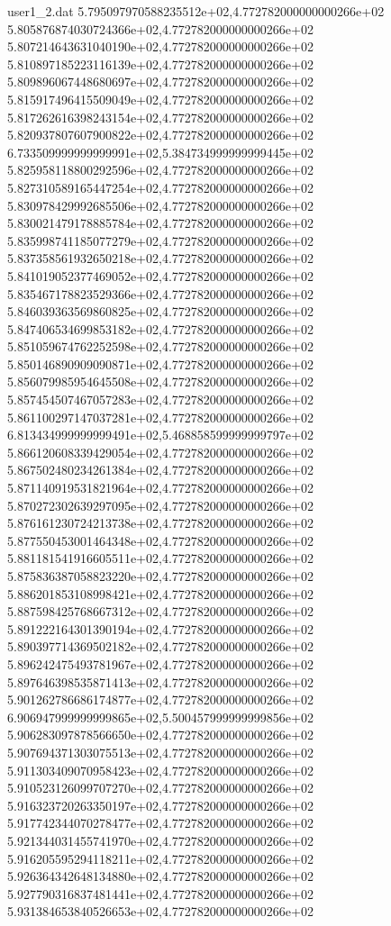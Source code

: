 \begin{filecontents}{user1_2.dat}
5.795097970588235512e+02,4.772782000000000266e+02
5.805876874030724366e+02,4.772782000000000266e+02
5.807214643631040190e+02,4.772782000000000266e+02
5.810897185223116139e+02,4.772782000000000266e+02
5.809896067448680697e+02,4.772782000000000266e+02
5.815917496415509049e+02,4.772782000000000266e+02
5.817262616398243154e+02,4.772782000000000266e+02
5.820937807607900822e+02,4.772782000000000266e+02
6.733509999999999991e+02,5.384734999999999445e+02
5.825958118800292596e+02,4.772782000000000266e+02
5.827310589165447254e+02,4.772782000000000266e+02
5.830978429992685506e+02,4.772782000000000266e+02
5.830021479178885784e+02,4.772782000000000266e+02
5.835998741185077279e+02,4.772782000000000266e+02
5.837358561932650218e+02,4.772782000000000266e+02
5.841019052377469052e+02,4.772782000000000266e+02
5.835467178823529366e+02,4.772782000000000266e+02
5.846039363569860825e+02,4.772782000000000266e+02
5.847406534699853182e+02,4.772782000000000266e+02
5.851059674762252598e+02,4.772782000000000266e+02
5.850146890909090871e+02,4.772782000000000266e+02
5.856079985954645508e+02,4.772782000000000266e+02
5.857454507467057283e+02,4.772782000000000266e+02
5.861100297147037281e+02,4.772782000000000266e+02
6.813434999999999491e+02,5.468858599999999797e+02
5.866120608339429054e+02,4.772782000000000266e+02
5.867502480234261384e+02,4.772782000000000266e+02
5.871140919531821964e+02,4.772782000000000266e+02
5.870272302639297095e+02,4.772782000000000266e+02
5.876161230724213738e+02,4.772782000000000266e+02
5.877550453001464348e+02,4.772782000000000266e+02
5.881181541916605511e+02,4.772782000000000266e+02
5.875836387058823220e+02,4.772782000000000266e+02
5.886201853108998421e+02,4.772782000000000266e+02
5.887598425768667312e+02,4.772782000000000266e+02
5.891222164301390194e+02,4.772782000000000266e+02
5.890397714369502182e+02,4.772782000000000266e+02
5.896242475493781967e+02,4.772782000000000266e+02
5.897646398535871413e+02,4.772782000000000266e+02
5.901262786686174877e+02,4.772782000000000266e+02
6.906947999999999865e+02,5.500457999999999856e+02
5.906283097878566650e+02,4.772782000000000266e+02
5.907694371303075513e+02,4.772782000000000266e+02
5.911303409070958423e+02,4.772782000000000266e+02
5.910523126099707270e+02,4.772782000000000266e+02
5.916323720263350197e+02,4.772782000000000266e+02
5.917742344070278477e+02,4.772782000000000266e+02
5.921344031455741970e+02,4.772782000000000266e+02
5.916205595294118211e+02,4.772782000000000266e+02
5.926364342648134880e+02,4.772782000000000266e+02
5.927790316837481441e+02,4.772782000000000266e+02
5.931384653840526653e+02,4.772782000000000266e+02

\end{filecontents}
